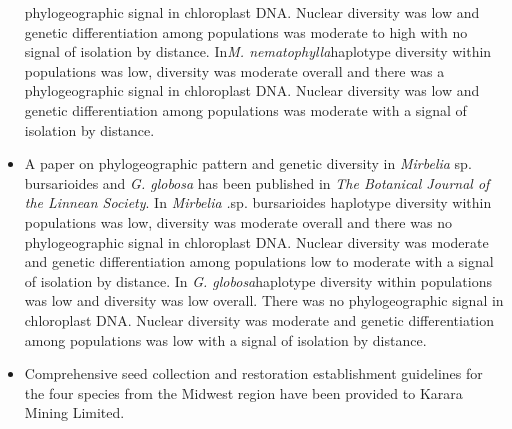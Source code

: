 \documentclass[version=last,
    paper=a4, %
    10pt, %
    usenames,
    dvipsnames,
    oneside, %
    headings=openany, %
    DIV=15 %
]{scrbook}
\begin{document}
\begin{itemize}
  phylogeographic signal in chloroplast DNA. Nuclear diversity was low
  and genetic differentiation among populations was moderate to high
  with no signal of isolation by distance. In\emph{M.
  nematophylla}haplotype diversity within populations was low, diversity
  was moderate overall and there was a phylogeographic signal in
  chloroplast DNA. Nuclear diversity was low and genetic differentiation
  among populations was moderate with a signal of isolation by distance.
\item
  A paper on phylogeographic pattern and genetic diversity in
  \emph{Mirbelia} sp. bursarioides and \emph{G. globosa} has been
  published in \emph{The Botanical Journal of the Linnean Society}. In
  \emph{Mirbelia} \emph{.}sp. bursarioides haplotype diversity within
  populations was low, diversity was moderate overall and there was no
  phylogeographic signal in chloroplast DNA. Nuclear diversity was
  moderate and genetic differentiation among populations low to moderate
  with a signal of isolation by distance. In \emph{G. globosa}haplotype
  diversity within populations was low and diversity was low overall.
  There was no phylogeographic signal in chloroplast DNA. Nuclear
  diversity was moderate and genetic differentiation among populations
  was low with a signal of isolation by distance.
\item
  Comprehensive seed collection and restoration establishment guidelines
  for the four species from the Midwest region have been provided to
  Karara Mining Limited.
\end{itemize}
\end{document}

